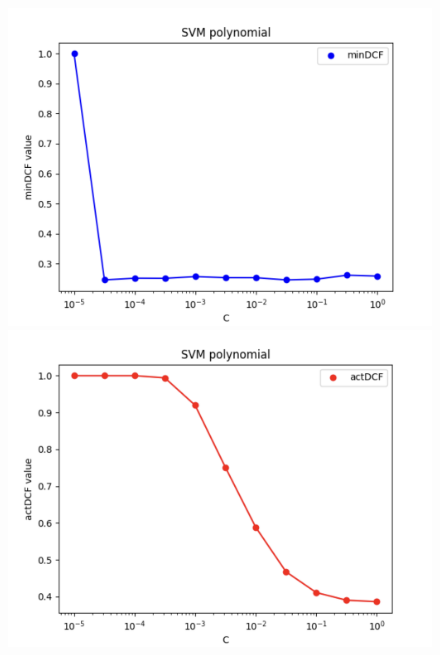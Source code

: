 \documentclass{article}
\begin{document}
\begin{figure}[H]
    \centering
    \begin{minipage}{.3\textwidth}
        \centering
        \includegraphics[width=\linewidth]{./img/SVM_P1.png}
    \end{minipage}%
    \begin{minipage}{.3\textwidth}
        \centering
        \includegraphics[width=\linewidth]{./img/SVM_P2.png}
    \end{minipage}
    \begin{minipage}{.3\textwidth}
        \centering

\end{minipage}
\end{figure}
\end{document}
